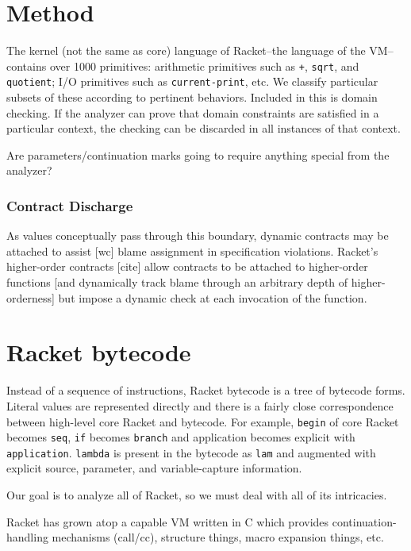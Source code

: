\documentclass[preprint]{sigplanconf}
\begin{document}
\section{Method}

The kernel (not the same as core) language of Racket--the language of the VM--contains over 1000 primitives: arithmetic primitives such as \texttt{+}, \texttt{sqrt}, and \texttt{quotient}; I/O primitives such as \texttt{current-print}, etc. We classify particular subsets of these according to pertinent behaviors.
Included in this is domain checking.
If the analyzer can prove that domain constraints are satisfied in a particular context, the checking can be discarded in all instances of that context.

Are parameters/continuation marks going to require anything special from the analyzer?

\subsubsection{Contract Discharge}
As values conceptually pass through this boundary, dynamic contracts may be attached to assist [wc] blame assignment in specification violations.
Racket's higher-order contracts [cite] allow contracts to be attached to higher-order functions [and dynamically track blame through an arbitrary depth of higher-orderness] but impose a dynamic check at each invocation of the function. 

\section{Racket bytecode}

Instead of a sequence of instructions, Racket bytecode is a tree of bytecode forms.
Literal values are represented directly and there is a fairly close correspondence between high-level core Racket and bytecode.
For example, \texttt{begin} of core Racket becomes \texttt{seq}, \texttt{if} becomes \texttt{branch} and application becomes explicit with \texttt{application}.
\texttt{lambda} is present in the bytecode as \texttt{lam} and augmented with explicit source, parameter, and variable-capture information.


Our goal is to analyze all of Racket, so we must deal with all of its intricacies.

Racket has grown atop a capable VM written in C which provides continuation-handling mechanisms (call/cc), structure things, macro expansion things, etc.
\end{document}
